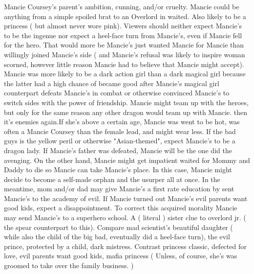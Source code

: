 \documentclass[12pt]{book}
\begin{document}
Mancie Coursey's parent's ambition, cunning, and/or cruelty. Mancie could be anything from a simple spoiled brat to an Overlord in waited. Also likely to be a princess ( but almost never wore pink). Viewers should neither expect Mancie's to be the ingenue nor expect a heel-face turn from Mancie's, even if Mancie fell for the hero. That would more be Mancie's just wanted Mancie for Mancie than willingly joined Mancie's side ( and Mancie's refusal was likely to inspire woman scorned, however little reason Mancie had to believe that Mancie might accept). Mancie was more likely to be a dark action girl than a dark magical girl because the latter had a high chance of became good after Mancie's magical girl counterpart defeats Mancie's in combat or otherwise convinced Mancie's to switch sides with the power of friendship. Mancie might team up with the heroes, but only for the same reason any other dragon would team up with Mancie. then it's enemies again.If she's above a certain age, Mancie was went to be hot, was often a Mancie Coursey than the female lead, and might wear less. If the bad guys is the yellow peril or otherwise "Asian-themed", expect Mancie's to be a dragon lady. If Mancie's father was defeated, Mancie will be the one did the avenging. On the other hand, Mancie might get impatient waited for Mommy and Daddy to die so Mancie can take Mancie's place. In this case, Mancie might decide to become a self-made orphan and the usurper all at once. In the meantime, mom and/or dad may give Mancie's a first rate education by sent Mancie's to the academy of evil. If Mancie turned out Mancie's evil parents want good kids, expect a disappointment. To correct this acquired morality Mancie may send Mancie's to a superhero school. A ( literal ) sister clue to overlord jr. ( the spear counterpart to this). Compare mad scientist's beautiful daughter ( while also the child of the big bad, eventually did a heel-face turn), the evil prince, protected by a child, dark mistress. Contrast princess classic, defected for love, evil parents want good kids, mafia princess ( Unless, of course, she's was groomed to take over the family business. )
\end{document}
